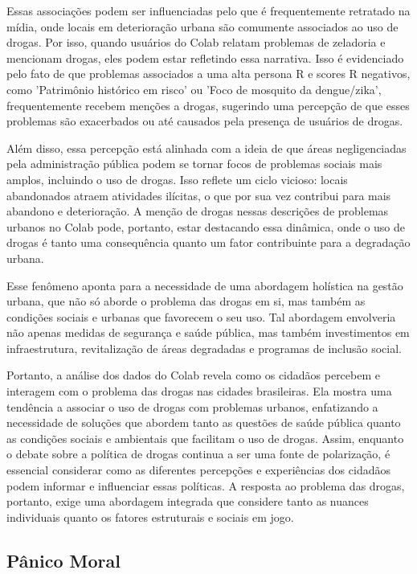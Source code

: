 Essas associações podem ser influenciadas pelo que é frequentemente retratado na mídia, onde locais em deterioração urbana são comumente associados ao uso de drogas. Por isso, quando usuários do Colab relatam problemas de zeladoria e mencionam drogas, eles podem estar refletindo essa narrativa. Isso é evidenciado pelo fato de que problemas associados a uma alta persona R e scores R negativos, como 'Patrimônio histórico em risco' ou 'Foco de mosquito da dengue/zika', frequentemente recebem menções a drogas, sugerindo uma percepção de que esses problemas são exacerbados ou até causados pela presença de usuários de drogas.

Além disso, essa percepção está alinhada com a ideia de que áreas negligenciadas pela administração pública podem se tornar focos de problemas sociais mais amplos, incluindo o uso de drogas. Isso reflete um ciclo vicioso: locais abandonados atraem atividades ilícitas, o que por sua vez contribui para mais abandono e deterioração. A menção de drogas nessas descrições de problemas urbanos no Colab pode, portanto, estar destacando essa dinâmica, onde o uso de drogas é tanto uma consequência quanto um fator contribuinte para a degradação urbana.

Esse fenômeno aponta para a necessidade de uma abordagem holística na gestão urbana, que não só aborde o problema das drogas em si, mas também as condições sociais e urbanas que favorecem o seu uso. Tal abordagem envolveria não apenas medidas de segurança e saúde pública, mas também investimentos em infraestrutura, revitalização de áreas degradadas e programas de inclusão social.

Portanto, a análise dos dados do Colab revela como os cidadãos percebem e interagem com o problema das drogas nas cidades brasileiras. Ela mostra uma tendência a associar o uso de drogas com problemas urbanos, enfatizando a necessidade de soluções que abordem tanto as questões de saúde pública quanto as condições sociais e ambientais que facilitam o uso de drogas. Assim, enquanto o debate sobre a política de drogas continua a ser uma fonte de polarização, é essencial considerar como as diferentes percepções e experiências dos cidadãos podem informar e influenciar essas políticas. A resposta ao problema das drogas, portanto, exige uma abordagem integrada que considere tanto as nuances individuais quanto os fatores estruturais e sociais em jogo.

\subsection{Pânico Moral}

